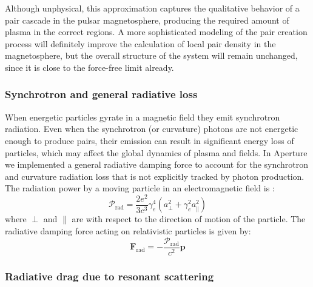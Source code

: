 Although unphysical, this approximation captures the qualitative behavior of
a pair cascade in the pulsar magnetosphere, producing the required amount of
plasma in the correct regions. A more sophisticated modeling of the pair
creation process will definitely improve the calculation of local pair density
in the magnetosphere, but the overall structure of the system will remain
unchanged, since it is close to the force-free limit already.

\subsubsection{Synchrotron and general radiative loss}
\label{sec:synchrotron-loss}

When energetic particles gyrate in a magnetic field they emit synchrotron
radiation. Even when the synchrotron (or curvature) photons are not energetic
enough to produce pairs, their emission can result in significant energy loss of
particles, which may affect the global dynamics of plasma and fields.
In Aperture we implemented a general radiative damping force to account for the
synchrotron and curvature radiation loss that is not explicitly tracked by
photon production. The radiation power by a moving particle in an
electromagnetic field is \citep[see e.g.][]{longair_high_2011}:
\begin{equation}
  \label{eq:rad-power}
  \mathcal{P}_\mathrm{rad} = \frac{2e^2}{3c^3}\gamma_{e}^{4}(a_{\perp}^2+\gamma_{e}^2a_{\parallel}^2)
\end{equation}
where $\perp$ and $\parallel$ are with respect to the direction of motion of the
particle. The radiative damping force acting on relativistic particles is given by:
\begin{equation}
  \label{eq:rad-force}
  \mathbf{F}_\mathrm{rad} = -\frac{\mathcal{P}_\mathrm{rad}}{c^2}\mathbf{p}
\end{equation}


\subsubsection{Radiative drag due to resonant scattering}
\label{sec:resonant-scattering}

